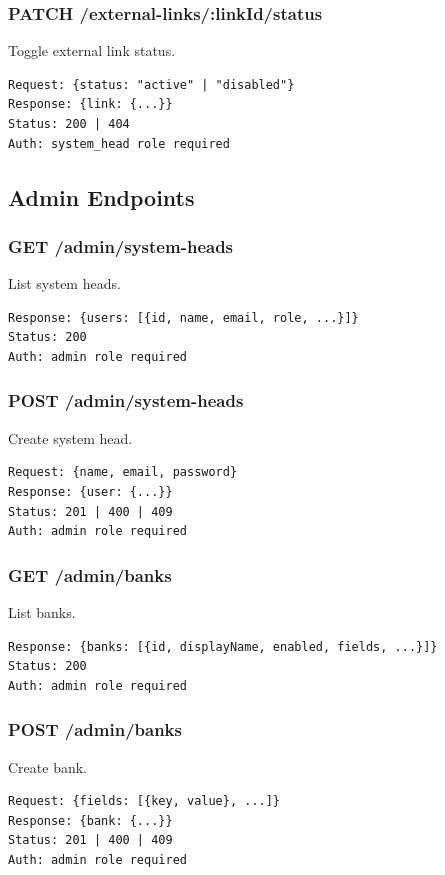 \documentclass[12pt,a4paper]{article}
\begin{document}
\subsubsection{PATCH /external-links/:linkId/status}
Toggle external link status.
\begin{lstlisting}
Request: {status: "active" | "disabled"}
Response: {link: {...}}
Status: 200 | 404
Auth: system_head role required
\end{lstlisting}

\subsection{Admin Endpoints}

\subsubsection{GET /admin/system-heads}
List system heads.
\begin{lstlisting}
Response: {users: [{id, name, email, role, ...}]}
Status: 200
Auth: admin role required
\end{lstlisting}

\subsubsection{POST /admin/system-heads}
Create system head.
\begin{lstlisting}
Request: {name, email, password}
Response: {user: {...}}
Status: 201 | 400 | 409
Auth: admin role required
\end{lstlisting}

\subsubsection{GET /admin/banks}
List banks.
\begin{lstlisting}
Response: {banks: [{id, displayName, enabled, fields, ...}]}
Status: 200
Auth: admin role required
\end{lstlisting}

\subsubsection{POST /admin/banks}
Create bank.
\begin{lstlisting}
Request: {fields: [{key, value}, ...]}
Response: {bank: {...}}
Status: 201 | 400 | 409
Auth: admin role required
\end{lstlisting}
\end{document}
